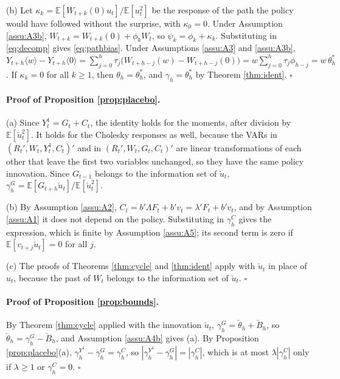 \documentclass[12pt,a4paper]{article}
\theoremstyle{definition}
\theoremstyle{definition}\newtheorem{example}{Example}
\theoremstyle{definition}\newtheorem{definition}{Definition}
\newcommand{\E}{\mathbb{E}}
\begin{document}
(b) Let $\kappa_k=\E[W_{t+k}(0)u_t]/\E[u_t^2]$ be the response of the path the policy would have followed without the surprise, with $\kappa_0=0$. Under Assumption \ref{assu:A3b}, $W_{t+k}=W_{t+k}(0)+\phi_kW_t$, so $\psi_k=\phi_k+\kappa_k$. Substituting in \eqref{eq:decomp} gives \eqref{eq:pathbias}. Under Assumptions \ref{assu:A3} and \ref{assu:A3b}, $Y_{t+h}\langle w\rangle-Y_{t+h}\langle 0\rangle=\sum_{j=0}^h\tau_j\big(W_{t+h-j}(w)-W_{t+h-j}(0)\big)=w\sum_{j=0}^h\tau_j\phi_{h-j}=w\,\theta^\ast_h$. If $\kappa_k=0$ for all $k\geq1$, then $\theta_h=\theta^\ast_h$, and $\gamma_h=\theta^\ast_h$ by Theorem \ref{thm:ident}. $\square$

\paragraph{Proof of Proposition \ref{prop:placebo}.} (a) Since $Y^1_t=G_t+C_t$, the identity holds for the moments, after division by $\E[\breve u_t^2]$. It holds for the Cholesky responses as well, because the VARs in $(R_t',W_t,Y^1_t,C_t)'$ and in $(R_t',W_t,G_t,C_t)'$ are linear transformations of each other that leave the first two variables unchanged, so they have the same policy innovation. Since $G_{t-1}$ belongs to the information set of $\breve u_t$, $\gamma^G_h=\E[G_{t+h}\breve u_t]/\E[\breve u_t^2]$.

(b) By Assumption \ref{assu:A2}, $C_t=b'\Lambda F_t+b'v_t=\lambda'F_t+b'v_t$, and by Assumption \ref{assu:A1} it does not depend on the policy. Substituting in $\gamma^C_h$ gives the expression, which is finite by Assumption \ref{assu:A5}; its second term is zero if $\E[v_{t+j}\breve u_t]=0$ for all $j$.

(c) The proofs of Theorems \ref{thm:cycle} and \ref{thm:ident} apply with $\breve u_t$ in place of $u_t$, because the past of $W_t$ belongs to the information set of $\breve u_t$. $\square$

\paragraph{Proof of Proposition \ref{prop:bounds}.} By Theorem \ref{thm:cycle} applied with the innovation $\breve u_t$, $\gamma^G_h=\breve\theta_h+\breve B_h$, so $\breve\theta_h=\gamma^G_h-\breve B_h$, and Assumption \ref{assu:A4b} gives (a). By Proposition \ref{prop:placebo}(a), $\gamma^{Y^1}_h-\gamma^G_h=\gamma^C_h$, so $|\gamma^{Y^1}_h-\gamma^G_h|=|\gamma^C_h|$, which is at most $\lambda|\gamma^C_h|$ only if $\lambda\geq1$ or $\gamma^C_h=0$. $\square$
\end{document}
